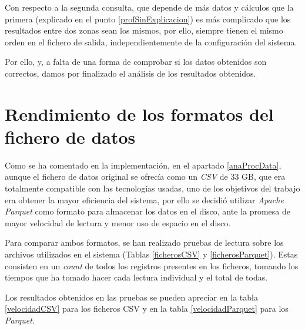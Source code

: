 Con respecto a la segunda consulta, que depende de más datos y cálculos que la primera (explicado en el punto \ref{profSinExplicacion}) es más complicado que los resultados entre dos zonas sean los mismos, por ello, siempre tienen el mismo orden en el fichero de salida, independientemente de la configuración del sistema.

Por ello, y, a falta de una forma de comprobar si los datos obtenidos son correctos, damos por finalizado el análisis de los resultados obtenidos.

\section{Rendimiento de los formatos del fichero de datos \label{resCompFich}}
Como se ha comentado en la implementación, en el apartado \ref{anaProcData}, aunque el fichero de datos original se ofrecía como un \textit{\gls{CSV}} de 33 GB, que era totalmente compatible con las tecnologías usadas, uno de los objetivos del trabajo era obtener la mayor eficiencia del sistema, por ello se decidió utilizar \textit{Apache Parquet} como formato para almacenar los datos en el disco, ante la promesa de mayor velocidad de lectura y menor uso de espacio en el disco.

Para comparar ambos formatos, se han realizado pruebas de lectura sobre los archivos utilizados en el sistema (Tablas \ref{ficherosCSV} y \ref{ficherosParquet}). Estas consisten en un \textit{count} de todos los registros presentes en los ficheros, tomando los tiempos que ha tomado hacer cada lectura individual y el total de todas.

Los resultados obtenidos en las pruebas se pueden apreciar en la tabla \ref{velocidadCSV} para los ficheros \gls{CSV} y en la tabla \ref{velocidadParquet} para los \textit{Parquet}.

